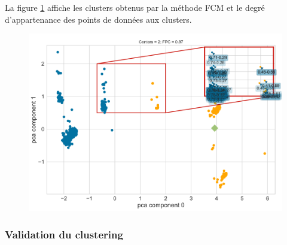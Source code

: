 \noindent La figure \ref{fuzzy_partition_plot} affiche les clusters obtenus par la méthode FCM et le degré d’appartenance des points de données aux clusters.

\begin{figure}[H]
	\begin{center}
		\includegraphics[width=\textwidth]{images/chapitre7/fuzzy_partition_plot.png}
	\end{center}
	\caption{}
	\label{fuzzy_partition_plot}
\end{figure}


\subsubsection{Validation du clustering}


